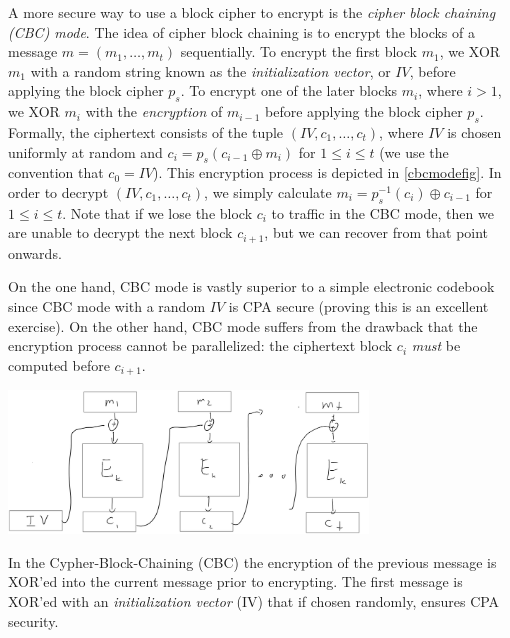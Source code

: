 A more secure way to use a block cipher to encrypt is the \emph{cipher
block chaining (CBC) mode}. The idea of cipher block chaining is to
encrypt the blocks of a message \(m = (m_1, \ldots, m_t)\) sequentially.
To encrypt the first block \(m_1\), we XOR \(m_1\) with a random string
known as the \emph{initialization vector}, or
\(\ensuremath{\mathit{IV}}\), before applying the block cipher \(p_s\).
To encrypt one of the later blocks \(m_i\), where \(i > 1\), we XOR
\(m_i\) with the \emph{encryption} of \(m_{i-1}\) before applying the
block cipher \(p_s\). Formally, the ciphertext consists of the tuple
\((\ensuremath{\mathit{IV}}, c_1, \ldots, c_t)\), where
\(\ensuremath{\mathit{IV}}\) is chosen uniformly at random and
\(c_i = p_s(c_{i-1} \oplus m_i)\) for \(1 \le i \le t\) (we use the
convention that \(c_0 = \ensuremath{\mathit{IV}}\)). This encryption
process is depicted in \cref{cbcmodefig}. In order to decrypt
\((\ensuremath{\mathit{IV}}, c_1, \ldots, c_t)\), we simply calculate
\(m_i = p_s^{-1}(c_i) \oplus c_{i-1}\) for \(1 \le i \le t\). Note that
if we lose the block \(c_i\) to traffic in the CBC mode, then we are
unable to decrypt the next block \(c_{i+1}\), but we can recover from
that point onwards.

On the one hand, CBC mode is vastly superior to a simple electronic
codebook since CBC mode with a random \(\ensuremath{\mathit{IV}}\) is
CPA secure (proving this is an excellent exercise). On the other hand,
CBC mode suffers from the drawback that the encryption process cannot be
parallelized: the ciphertext block \(c_i\) \emph{must} be computed
before \(c_{i+1}\).


\begin{marginfigure}
\centering
\includegraphics[width=\linewidth, height=1.5in, keepaspectratio]{../figure/cbc-mode.jpg}
\caption{In the Cypher-Block-Chaining (CBC) the encryption of the
previous message is XOR'ed into the current message prior to encrypting.
The first message is XOR'ed with an \emph{initialization vector} (IV)
that if chosen randomly, ensures CPA security.}
\label{cbcmodefig}
\end{marginfigure}

